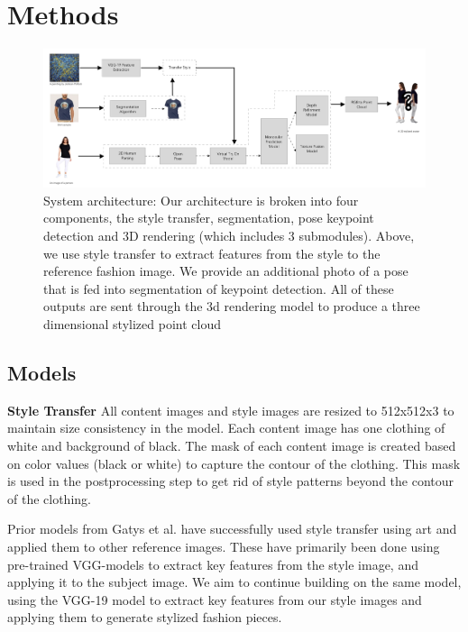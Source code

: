 \documentclass{article}
\begin{document}
\section{Methods}


\begin{figure}[H]
    \centering
    \includegraphics[width=\textwidth]{report/diagrams/3d_sari_2.png}
    \caption{System architecture: Our architecture is broken into four components, the style transfer, segmentation, pose keypoint detection and 3D rendering (which includes 3 submodules). Above, we use style transfer to extract features from the style to the reference fashion image. We provide an additional photo of a pose that is fed into segmentation of keypoint detection. All of these outputs are sent through the 3d rendering model to produce a three dimensional stylized point cloud}
\end{figure}

\subsection{Models}
\textbf{Style Transfer}
All content images and style images are resized to 512x512x3 to maintain size consistency in the model. Each content image has one clothing of white and background of black. The mask of each content image is created based on color values (black or white) to capture the contour of the clothing. This mask is used in the postprocessing step to get rid of style patterns beyond the contour of the clothing. 

Prior models from Gatys et al.\cite{gatys2016styleTransfer} have successfully used style transfer using art and applied them to other reference images. These have primarily been done using pre-trained VGG-models to extract key features from the style image, and applying it to the subject image. We aim to continue building on the same model, using the VGG-19 model to extract key features from our style images and applying them to generate stylized fashion pieces. 
\end{document}
